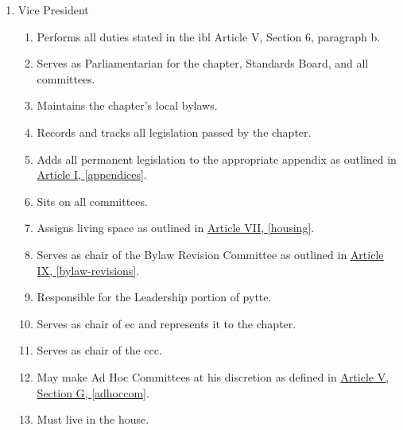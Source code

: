 \begin{enumerate}
		\item Vice President
			\begin{enumerate}
				\item Performs all duties stated in the \gls{ibl} Article V, Section 6, paragraph b.
				\item Serves as Parliamentarian for the chapter, Standards Board, and all committees.
				\item Maintains the chapter's local bylaws. %
                \item Records and tracks all legislation passed by the chapter.
				\item Adds all permanent legislation to the appropriate appendix as outlined in \hyperref[appendices]{Article I, \autoref*{appendices}}.
				\item Sits on all committees.
				\item Assigns living space as outlined in \hyperref[housing]{Article VII, \autoref*{housing}}.
				\item Serves as chair of the Bylaw Revision Committee as outlined in \hyperref[bylaw-revisions]{Article IX, \autoref*{bylaw-revisions}}.
				\item Responsible for the Leadership portion of \gls{pytte}.
				\item Serves as chair of \gls{ec} and represents it to the chapter.
				\item Serves as chair of the \gls{ccc}.
				\item May make Ad Hoc Committees at his discretion as defined in \hyperref[adhoccom]{Article V, Section G, \autoref*{adhoccom}}.
				\item Must live in the house.
			\end{enumerate}


\end{enumerate}
